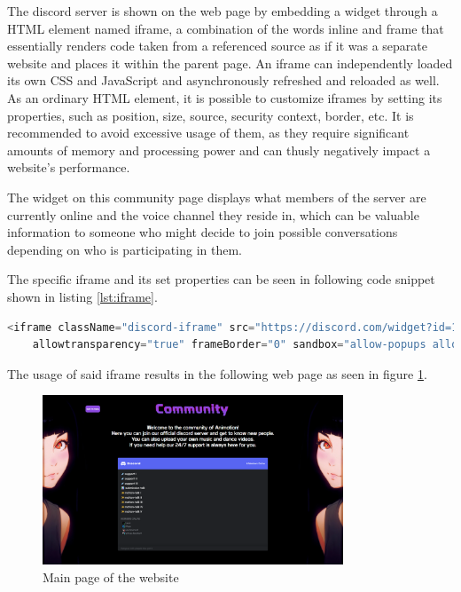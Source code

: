 The discord server is shown on the web page by embedding a widget through a HTML element named
iframe, a combination of the words inline and frame that essentially renders code taken from a
referenced source as if it was a separate website and places it within the parent page. An iframe
can independently loaded its own CSS and JavaScript and asynchronously refreshed and reloaded as
well. As an ordinary HTML element, it is possible to customize iframes by setting its properties,
such as position, size, source, security context, border, etc. It is recommended to avoid excessive
usage of them, as they require significant amounts of memory and processing power and can thusly
negatively impact a website's performance. %

The widget on this community page displays what members of the server are currently online and the
voice channel they reside in, which can be valuable information to someone who might decide to join
possible conversations depending on who is participating in them.

The specific iframe and its set properties can be seen in following code snippet shown in listing \ref{lst:iframe}.

\begin{lstlisting}[language=Python,caption=iframe used for discord widget,label=lst:iframe]
    <iframe className="discord-iframe" src="https://discord.com/widget?id=1035647726634934382&theme=dark"
    allowtransparency="true" frameBorder="0" sandbox="allow-popups allow-popups-to-escape-sandbox allow-same-origin allow-scripts"></iframe>
\end{lstlisting}
The usage of said iframe results in the following web page as seen in figure \ref{fig:communitypage}.
\\
\begin{figure}[htb]
    \centering
    \includegraphics[width=0.8\textwidth]{pics/Animotion_community.png}
    \caption{Main page of the website}
    \label{fig:communitypage}
\end{figure}
\\

